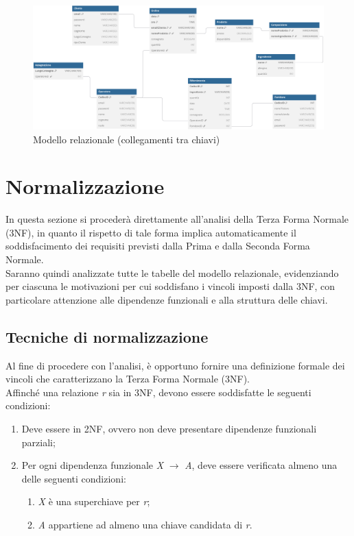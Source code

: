 \documentclass[12pt,a4paper]{article}
\begin{document}
    \begin{figure}[H]
        \centering 
        \vspace{-10pt}  %
        \includegraphics[width=\textwidth]{figures/Relational_model.pdf}
        \vspace{-20pt}  %
        \caption{Modello relazionale (collegamenti tra chiavi)}
    \end{figure}  

    \newpage
    \section{Normalizzazione}
    In questa sezione si procederà direttamente all'analisi della Terza Forma Normale (3NF), in quanto il rispetto di tale forma implica automaticamente il soddisfacimento dei requisiti previsti dalla Prima e dalla Seconda Forma Normale. \\
    Saranno quindi analizzate tutte le tabelle del modello relazionale, evidenziando per ciascuna le motivazioni per cui soddisfano i vincoli imposti dalla 3NF, con particolare attenzione alle dipendenze funzionali e alla struttura delle chiavi.

    \subsection{Tecniche di normalizzazione}
    Al fine di procedere con l'analisi, è opportuno fornire una definizione formale dei vincoli che caratterizzano la Terza Forma Normale (3NF).\\
    Affinché una relazione \textit{r} sia in 3NF, devono essere soddisfatte le seguenti condizioni:

    \begin{enumerate}[leftmargin=1.3em]
        \item Deve essere in 2NF, ovvero non deve presentare dipendenze funzionali parziali;
        \item Per ogni dipendenza funzionale \textit{X} $\rightarrow$ \textit{A}, deve essere verificata almeno una delle seguenti condizioni:
            \begin{enumerate}[leftmargin=1.3em, label=\alph*.]
            \item \textit{X} è una superchiave per \textit{r};
            \item \textit{A} appartiene ad almeno una chiave candidata di \textit{r}.
        \end{enumerate}
    \end{enumerate}
\end{document}
